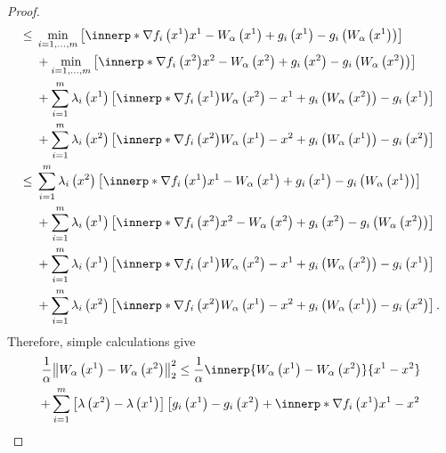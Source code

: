 \documentclass[../../main]{subfiles}
\begin{document}
\begin{proof}
\begin{align}
        \le{} & \min_{i = 1, \dots, m} \left[ \innerp*{\nabla f_i\left(x^1\right)}{x^1 - W_\alpha\left(x^1\right)} + g_i\left(x^1\right) - g_i\left(W_\alpha\left(x^1\right)\right) \right]                       \\
              & + \min_{i = 1, \dots, m} \left[ \innerp*{\nabla f_i\left(x^2\right)}{x^2 - W_\alpha\left(x^2\right)} + g_i\left(x^2\right) - g_i\left(W_\alpha\left(x^2\right)\right) \right]                     \\
              & + \sum_{i = 1}^{m} \lambda_i\left(x^1\right) \left[ \innerp*{\nabla f_i\left(x^1\right)}{W_\alpha\left(x^2\right) - x^1} + g_i\left(W_\alpha\left(x^2\right)\right) - g_i\left(x^1\right) \right] \\
              & + \sum_{i = 1}^{m} \lambda_i\left(x^2\right) \left[ \innerp*{\nabla f_i\left(x^2\right)}{W_\alpha\left(x^1\right) - x^2} + g_i\left(W_\alpha\left(x^1\right)\right) - g_i\left(x^2\right) \right] \\
        \le{} & \sum_{i = 1}^{m} \lambda_i\left(x^2\right) \left[ \innerp*{\nabla f_i\left(x^1\right)}{x^1 - W_\alpha\left(x^1\right)} + g_i\left(x^1\right) - g_i\left(W_\alpha\left(x^1\right)\right) \right]   \\
              & + \sum_{i = 1}^{m} \lambda_i\left(x^1\right) \left[ \innerp*{\nabla f_i\left(x^2\right)}{x^2 - W_\alpha\left(x^2\right)} + g_i\left(x^2\right) - g_i\left(W_\alpha\left(x^2\right)\right) \right] \\
              & + \sum_{i = 1}^{m} \lambda_i\left(x^1\right) \left[ \innerp*{\nabla f_i\left(x^1\right)}{W_\alpha\left(x^2\right) - x^1} + g_i\left(W_\alpha\left(x^2\right)\right) - g_i\left(x^1\right) \right] \\
              & + \sum_{i = 1}^{m} \lambda_i\left(x^2\right) \left[ \innerp*{\nabla f_i\left(x^2\right)}{W_\alpha\left(x^1\right) - x^2} + g_i\left(W_\alpha\left(x^1\right)\right) - g_i\left(x^2\right) \right]
        .\end{align}
    Therefore, simple calculations give
    \begin{multline} \label{eq:cont_w_alpha:cont}
        \frac{1}{\alpha} \norm*{W_\alpha\left(x^1\right) - W_\alpha\left(x^2\right)}_2^2 \le \frac{1}{\alpha} \innerp{W_\alpha\left(x^1\right) - W_\alpha\left(x^2\right)}{x^1 - x^2} \\
        + \sum_{i = 1}^{m} \left[ \lambda\left(x^2\right) - \lambda\left(x^1\right) \right] \left[ g_i\left(x^1\right) - g_i\left(x^2\right) + \innerp*{\nabla f_i\left(x^1\right)}{x^1 - x^2} \right. \\

\end{multline}
\end{proof}
\end{document}

